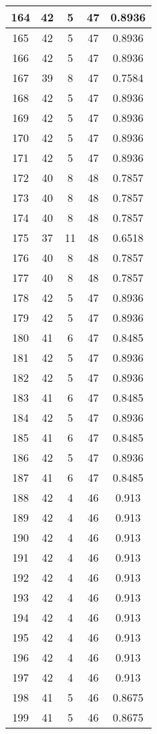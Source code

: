\documentclass[letterpaper, 12pt]{article}
\begin{document}
\begin{longtable}{|c|c|c|c|c|}
\hline
164 & 42 & 5 & 47 & 0.8936 \\
\hline
165 & 42 & 5 & 47 & 0.8936 \\
\hline
166 & 42 & 5 & 47 & 0.8936 \\
\hline
167 & 39 & 8 & 47 & 0.7584 \\
\hline
168 & 42 & 5 & 47 & 0.8936 \\
\hline
169 & 42 & 5 & 47 & 0.8936 \\
\hline
170 & 42 & 5 & 47 & 0.8936 \\
\hline
171 & 42 & 5 & 47 & 0.8936 \\
\hline
172 & 40 & 8 & 48 & 0.7857 \\
\hline
173 & 40 & 8 & 48 & 0.7857 \\
\hline
174 & 40 & 8 & 48 & 0.7857 \\
\hline
175 & 37 & 11 & 48 & 0.6518 \\
\hline
176 & 40 & 8 & 48 & 0.7857 \\
\hline
177 & 40 & 8 & 48 & 0.7857 \\
\hline
178 & 42 & 5 & 47 & 0.8936 \\
\hline
179 & 42 & 5 & 47 & 0.8936 \\
\hline
180 & 41 & 6 & 47 & 0.8485 \\
\hline
181 & 42 & 5 & 47 & 0.8936 \\
\hline
182 & 42 & 5 & 47 & 0.8936 \\
\hline
183 & 41 & 6 & 47 & 0.8485 \\
\hline
184 & 42 & 5 & 47 & 0.8936 \\
\hline
185 & 41 & 6 & 47 & 0.8485 \\
\hline
186 & 42 & 5 & 47 & 0.8936 \\
\hline
187 & 41 & 6 & 47 & 0.8485 \\
\hline
188 & 42 & 4 & 46 & 0.913 \\
\hline
189 & 42 & 4 & 46 & 0.913 \\
\hline
190 & 42 & 4 & 46 & 0.913 \\
\hline
191 & 42 & 4 & 46 & 0.913 \\
\hline
192 & 42 & 4 & 46 & 0.913 \\
\hline
193 & 42 & 4 & 46 & 0.913 \\
\hline
194 & 42 & 4 & 46 & 0.913 \\
\hline
195 & 42 & 4 & 46 & 0.913 \\
\hline
196 & 42 & 4 & 46 & 0.913 \\
\hline
197 & 42 & 4 & 46 & 0.913 \\
\hline
198 & 41 & 5 & 46 & 0.8675 \\
\hline
199 & 41 & 5 & 46 & 0.8675 \\
\hline
\end{longtable}
\end{document}
